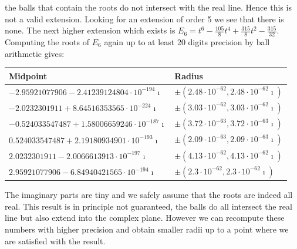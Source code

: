 \documentclass[a4paper,10pt]{article}
\begin{document}
the balls that contain the roots do not intersect with the real line.
Hence this is not a valid extension.
Looking for an extension of order 5 we see that there is none. The next higher extension
which exists is $E_6 = t^6 -\frac{105}{8}t^4 + \frac{315}{8}t^2 - \frac{315}{32}$.
Computing the roots of $E_6$ again up to at least 20 digits precision by ball arithmetic gives:
\begin{table}[h]
  \centering
  \begin{tabular}{|l|l|}
  \hline
  Midpoint & Radius \\
  \hline
  $-2.95921077906 - 2.41239124804 \cdot 10^{-194}\imath$  & $\pm (2.48 \cdot 10^{-62}, 2.48 \cdot 10^{-62}\imath)$ \\
  $-2.0232301911 + 8.64516353565 \cdot 10^{-224}\imath$   & $\pm (3.03 \cdot 10^{-62}, 3.03 \cdot 10^{-62}\imath)$ \\
  $-0.524033547487 + 1.58006659246 \cdot 10^{-187}\imath$ & $\pm (3.72 \cdot 10^{-63}, 3.72 \cdot 10^{-63}\imath)$ \\
  $0.524033547487 + 2.19180934901 \cdot 10^{-193}\imath$  & $\pm (2.09 \cdot 10^{-63}, 2.09 \cdot 10^{-63}\imath)$ \\
  $2.0232301911 - 2.0066613913 \cdot 10^{-197}\imath$     & $\pm (4.13 \cdot 10^{-62}, 4.13 \cdot 10^{-62}\imath)$ \\
  $2.95921077906 - 6.84940421565 \cdot 10^{-194}\imath$   & $\pm (2.3 \cdot 10^{-62}, 2.3 \cdot 10^{-62}\imath)$ \\
  \hline
  \end{tabular}
\end{table}
The imaginary parts are tiny and we safely assume that the roots are indeed all real.
This result is in principle not guaranteed, the balls do all intersect the real line
but also extend into the complex plane. However we can recompute these numbers with higher
precision and obtain smaller radii up to a point where we are satisfied with the result.
\end{document}
